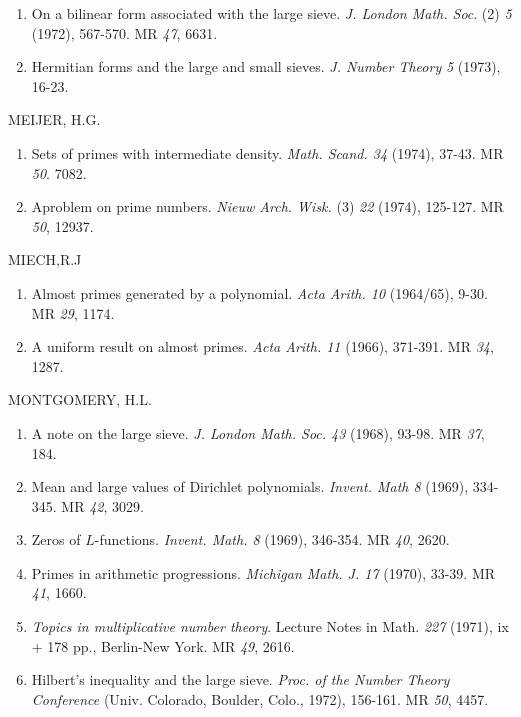 \begin{thebibliography}{99}
\begin{enumerate}
\item On a bilinear form associated with the large
  sieve. \textit{J. London Math. Soc}. (2) {\em 5} (1972), 567-570. MR
  {\em 47}, 6631.

\item Hermitian forms and the large and small sieves. \textit{J. Number
  Theory} {\em 5} (1973), 16-23.
\end{enumerate}

 MEIJER, H.G.
\begin{enumerate}
\item Sets of primes with intermediate
  density. \textit{Math. Scand. 34} (1974), 37-43. MR {\em 50}. 7082. 

\item A\pageoriginale problem on prime numbers. \textit{Nieuw
  Arch. Wisk.} (3) 
  {\em 22} (1974), 125-127. MR {\em 50}, 12937. 
\end{enumerate}

 MIECH,R.J
\begin{enumerate}
\item Almost primes generated by a polynomial. \textit{Acta
  Arith. 10} (1964/65), 9-30. MR {\em 29}, 1174.

\item A uniform result on almost primes. \textit{Acta
  Arith. 11} (1966), 371-391. MR {\em 34}, 1287. 
\end{enumerate}

 MONTGOMERY, H.L.
\begin{enumerate}
\item A note on the large sieve. \textit{J. London
  Math. Soc. 43} (1968), 93-98. MR {\em 37}, 184. 

\item Mean and large values of Dirichlet
  polynomials. \textit{Invent. Math 8} (1969), 334-345. MR {\em 42},
  3029.  

\item Zeros of $L$-functions. \textit{Invent. Math.
  8} (1969), 346-354. MR {\em 40}, 2620. 

\item Primes in arithmetic progressions. \textit{Michigan Math. J.
  17} (1970), 33-39. MR {\em 41}, 1660. 

\item \textit{Topics in multiplicative number theory}. Lecture Notes
  in Math. {\em 227} (1971), ix + 178 pp., Berlin-New York. MR {\em
    49}, 2616. 

\item Hilbert's inequality and the large sieve. \textit{Proc. of the
  Number Theory Conference} (Univ. Colorado, Boulder, Colo., 1972),
  156-161. MR {\em 50}, 4457. 


\end{enumerate}
\end{thebibliography}
